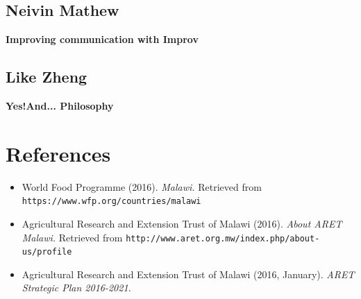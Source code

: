 \documentclass[12pt,letterpaper]{article}
\begin{document}
\clearpage
\subsection{Neivin Mathew}
\textbf{Improving communication with Improv}\par

		
	
\clearpage
\subsection{Like Zheng}
\textbf{Yes!And... Philosophy}\par



\clearpage
\section{References}
\begin{flushleft}
\begin{itemize}[leftmargin=12pt]

\item World Food Programme (2016). \emph{Malawi.}
 Retrieved from \texttt{https://www.wfp.org/countries/malawi}

\item Agricultural Research and Extension Trust of Malawi (2016). \emph{About ARET Malawi.}
Retrieved from \texttt{http://www.aret.org.mw/index.php/about-us/profile}

\item Agricultural Research and Extension Trust of Malawi (2016, January). \emph{ARET Strategic Plan 2016-2021.}


\end{itemize}
\end{flushleft}   
\end{document}
